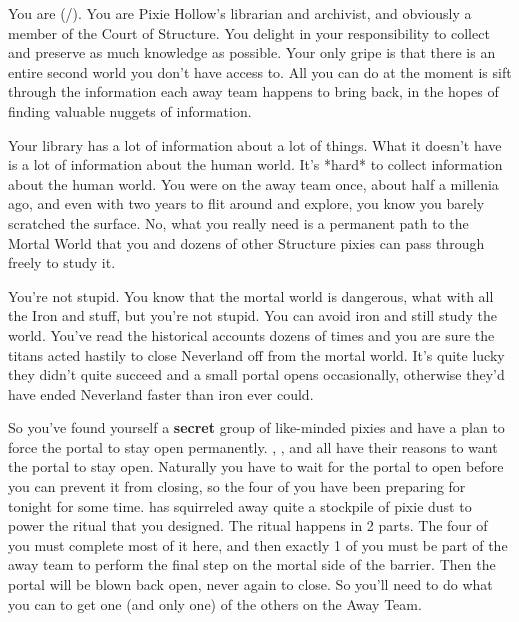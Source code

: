 \documentclass[char]{PP}
\begin{document}
\name{\cSLibrarian{}}

You are \cSLibrarian{} (\cSLibrarian{\They}/\cSLibrarian{\Them}). You are Pixie Hollow’s librarian and archivist, and obviously a member of the Court of Structure. You delight in your responsibility to collect and preserve as much knowledge as possible. Your only gripe is that there is an entire second world you don’t have access to. All you can do at the moment is sift through the information each away team happens to bring back, in the hopes of finding valuable nuggets of information.

Your library has a lot of information about a lot of things. What it doesn’t have is a lot of information about the human world. It’s *hard* to collect information about the human world. You were on the away team once, about half a millenia ago, and even with two years to flit around and explore, you know you barely scratched the surface. No, what you really need is a permanent path to the Mortal World that you and dozens of other Structure pixies can pass through freely to study it.

You’re not stupid. You know that the mortal world is dangerous, what with all the Iron and stuff, but you’re not stupid. You can avoid iron and still study the world. You’ve read the historical accounts dozens of times and you are sure the titans acted hastily to close Neverland off from the mortal world. It’s quite lucky they didn’t quite succeed and a small portal opens occasionally, otherwise they’d have ended Neverland faster than iron ever could.

So you’ve found yourself a \textbf{secret} group of like-minded pixies and have a plan to force the portal to stay open permanently. \cFHeart{}, \cESweet{}, and \cMIron{} all have their reasons to want the portal to stay open. Naturally you have to wait for the portal to open before you can prevent it from closing, so the four of you have been preparing for tonight for some time. \cMIron{} has squirreled away quite a stockpile of pixie dust to power the ritual that you designed. The ritual happens in 2 parts. The four of you must complete most of it here, and then exactly 1 of you must be part of the away team to perform the final step on the mortal side of the barrier. Then the portal will be blown back open, never again to close. So you’ll need to do what you can to get one (and only one) of the others on the Away Team.
\end{document}
